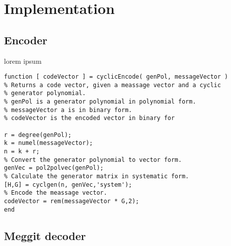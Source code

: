 \documentclass[MiniProjectMain]{subfiles}
\begin{document}
\chapter{Implementation}
\section{Encoder}
lorem ipsum
\begin{lstlisting}[caption=Cyclic encoding]
function [ codeVector ] = cyclicEncode( genPol, messageVector )
% Returns a code vector, given a meassage vector and a cyclic 
% generator polynomial.
% genPol is a generator polynomial in polynomial form.
% messageVector a is in binary form.
% codeVector is the encoded vector in binary for

r = degree(genPol);
k = numel(messageVector);
n = k + r;
% Convert the generator polynomial to vector form.
genVec = pol2polvec(genPol);
% Calculate the generator matrix in systematic form.
[H,G] = cyclgen(n, genVec,'system');
% Encode the meassage vector.
codeVector = rem(messageVector * G,2);
end
\end{lstlisting}


\section{Meggit decoder}
\end{document}
